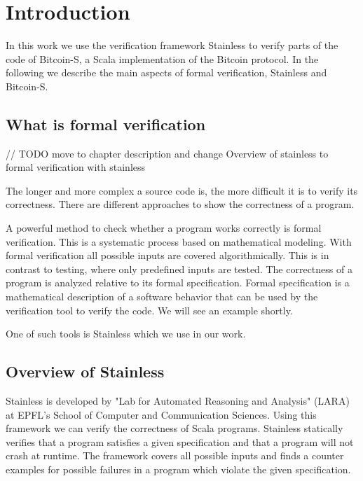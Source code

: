 \chapter{Introduction}
\label{chap:introduction}

In this work we use the verification framework Stainless to verify parts of the code of Bitcoin-S, a Scala implementation of the Bitcoin protocol.
In the following we describe the main aspects of formal verification, Stainless and Bitcoin-S.


\section{What is formal verification}
\label{sec:formal_verification}

// TODO move to chapter description and change Overview of stainless to formal verification with stainless

The longer and more complex a source code is, the more difficult it is to verify its correctness.
There are different approaches to show the correctness of a program.

A powerful method to check whether a program works correctly is formal verification.
This is a systematic process based on mathematical modeling.
With formal verification all possible inputs are covered algorithmically.
This is in contrast to testing, where only predefined inputs are tested.
The correctness of a program is analyzed relative to its formal specification.
Formal specification is a mathematical description of a software behavior that can be used by the verification tool to verify the code.
We will see an example shortly.

One of such tools is Stainless which we use in our work.


\section{Overview of Stainless}
\label{sec:stainless}

Stainless is developed by "Lab for Automated Reasoning and Analysis" (LARA) at EPFL's School of Computer and Communication Sciences.
Using this framework we can verify the correctness of Scala programs.
Stainless statically verifies that a program satisfies a given specification and that a program will not crash at runtime.
The framework covers all possible inputs and finds a counter examples for possible failures in a program which violate the given specification. \cite{Stainless:introduction}


